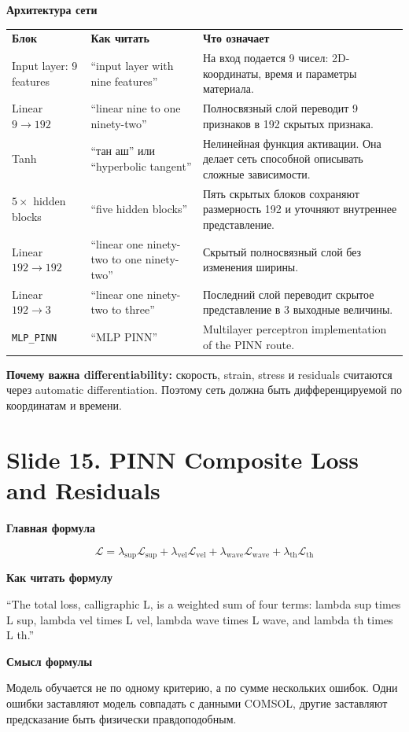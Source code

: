\documentclass[11pt]{article}
\newcommand{\slide}[1]{\section*{\textcolor{TitleBlue}{#1}}}
\newcommand{\minihead}[1]{\vspace{3pt}\textbf{\textcolor{TitleBlue}{#1}}\par}
\newcommand{\callout}[1]{%
  \vspace{3pt}
  \noindent\colorbox{SoftBlue}{%
    \parbox{\dimexpr\linewidth-2\fboxsep\relax}{\raggedright #1}
  }
  \vspace{3pt}
}
\begin{document}
\minihead{Архитектура сети}
\begin{tabularx}{\linewidth}{L{38mm}L{38mm}X}
\textbf{Блок} & \textbf{Как читать} & \textbf{Что означает}\\
Input layer: 9 features & ``input layer with nine features'' & На вход подается 9 чисел: 2D-координаты, время и параметры материала.\\
Linear $9\rightarrow192$ & ``linear nine to one ninety-two'' & Полносвязный слой переводит 9 признаков в 192 скрытых признака.\\
Tanh & ``тан аш'' или ``hyperbolic tangent'' & Нелинейная функция активации. Она делает сеть способной описывать сложные зависимости.\\
$5\times$ hidden blocks & ``five hidden blocks'' & Пять скрытых блоков сохраняют размерность 192 и уточняют внутреннее представление.\\
Linear $192\rightarrow192$ & ``linear one ninety-two to one ninety-two'' & Скрытый полносвязный слой без изменения ширины.\\
Linear $192\rightarrow3$ & ``linear one ninety-two to three'' & Последний слой переводит скрытое представление в 3 выходные величины.\\
\texttt{MLP\_PINN} & ``MLP PINN'' & Multilayer perceptron implementation of the PINN route.\\
\end{tabularx}

\callout{\textbf{Почему важна differentiability:} скорость, strain, stress и residuals считаются через automatic differentiation. Поэтому сеть должна быть дифференцируемой по координатам и времени.}

\slide{Slide 15. PINN Composite Loss and Residuals}

\minihead{Главная формула}
\[
  \mathcal{L}
  =
  \lambda_{\mathrm{sup}}\mathcal{L}_{\mathrm{sup}}
  +
  \lambda_{\mathrm{vel}}\mathcal{L}_{\mathrm{vel}}
  +
  \lambda_{\mathrm{wave}}\mathcal{L}_{\mathrm{wave}}
  +
  \lambda_{\mathrm{th}}\mathcal{L}_{\mathrm{th}}
\]

\minihead{Как читать формулу}
``The total loss, calligraphic L, is a weighted sum of four terms: lambda sup times L sup, lambda vel times L vel, lambda wave times L wave, and lambda th times L th.''

\minihead{Смысл формулы}
Модель обучается не по одному критерию, а по сумме нескольких ошибок. Одни ошибки заставляют модель совпадать с данными COMSOL, другие заставляют предсказание быть физически правдоподобным.
\end{document}
